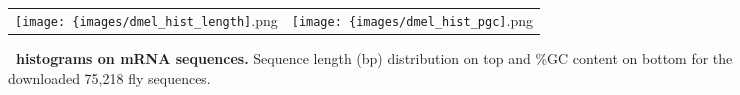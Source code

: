 % 
%

\begin{figure}[!h]

 \begin{center}
 
  \begin{tabular}{cc}
   \texttt{[image: \{images/dmel\_hist\_length]}.png} &
   \texttt{[image: \{images/dmel\_hist\_pgc]}.png}    \\
  \end{tabular}
  \parbox{0.7\textwidth}{%
   \caption[\dmel\ histograms on mRNA sequences]{%
   \label{fig:histograms}\textbf{\dmel\ histograms on mRNA sequences.} Sequence length (bp) distribution on top and \%GC content on bottom for the downloaded 75,218 fly sequences. 
   }%
  }%

 \end{center}
 
\end{figure}
